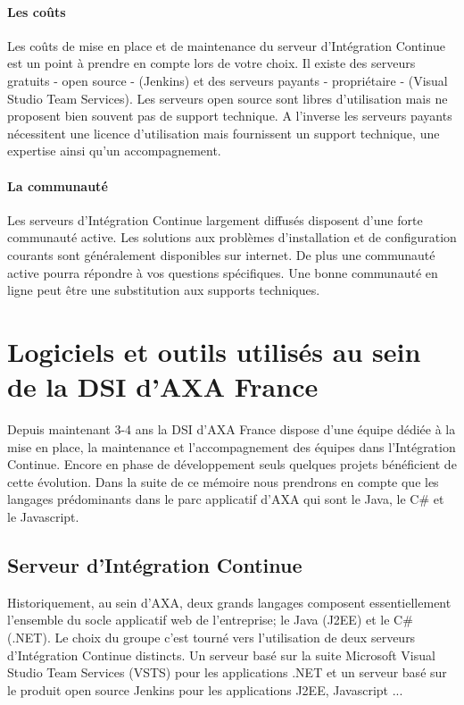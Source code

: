       \paragraph{Les coûts} Les coûts de mise en place et de maintenance du serveur d'Intégration Continue est un point à prendre en compte lors de votre choix. Il existe des serveurs gratuits - open source - (Jenkins) et des serveurs payants - propriétaire - (Visual Studio Team Services). Les serveurs open source sont libres d'utilisation mais ne proposent bien souvent pas de support technique. A l'inverse les serveurs payants nécessitent une licence d'utilisation mais fournissent un support technique, une expertise ainsi qu'un accompagnement.

      \paragraph{La communauté} Les serveurs d'Intégration Continue largement diffusés disposent d'une forte communauté active. Les solutions aux problèmes d'installation et de configuration courants sont généralement disponibles sur internet. De plus une communauté active pourra répondre à vos questions spécifiques. Une bonne communauté en ligne peut être une substitution aux supports techniques.

  \section{Logiciels et outils utilisés au sein de la DSI d'AXA France}
  Depuis maintenant 3-4 ans la DSI d'AXA France dispose d'une équipe dédiée à la mise en place, la maintenance et l'accompagnement des équipes dans l'Intégration Continue. Encore en phase de développement seuls quelques projets bénéficient de cette évolution. Dans la suite de ce mémoire nous prendrons en compte que les langages prédominants dans le parc applicatif d'AXA qui sont le Java, le C\# et le Javascript.

    \subsection{Serveur d’Intégration Continue}
    Historiquement, au sein d'AXA, deux grands langages composent essentiellement l'ensemble du socle applicatif web de l'entreprise; le Java (J2EE) et le C\# (.NET). Le choix du groupe c'est tourné vers l'utilisation de deux serveurs d'Intégration Continue distincts. Un serveur basé sur la suite Microsoft Visual Studio Team Services (VSTS) pour les applications .NET et un serveur basé sur le produit open source Jenkins pour les applications J2EE, Javascript ...\\

